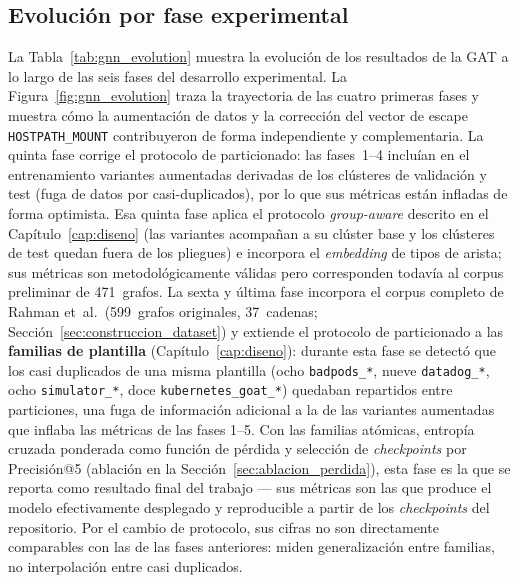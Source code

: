 \subsection{Evolución por fase experimental}

La Tabla~\ref{tab:gnn_evolution} muestra la evolución de los resultados de la \ac{GAT}
a lo largo de las seis fases del desarrollo experimental. La
Figura~\ref{fig:gnn_evolution} traza la trayectoria de las cuatro
primeras fases y muestra cómo la aumentación de datos y la corrección del vector
de escape \texttt{HOSTPATH\_MOUNT} contribuyeron de forma independiente y
complementaria. La quinta fase corrige el protocolo de particionado: las fases~1--4
incluían en el entrenamiento variantes aumentadas derivadas de los
clústeres de validación y test (fuga de datos por casi-duplicados), por lo que sus
métricas están infladas de forma optimista. Esa quinta fase aplica el protocolo
\textit{group-aware} descrito en el Capítulo~\ref{cap:diseno} (las variantes acompañan a su
clúster base y los clústeres de test quedan fuera de los pliegues) e incorpora el
\textit{embedding} de tipos de arista; sus métricas son metodológicamente válidas
pero corresponden todavía al corpus preliminar de 471~grafos. La sexta y última
fase incorpora el corpus completo de Rahman et~al.\ (599~grafos originales,
37~cadenas; Sección~\ref{sec:construccion_dataset}) y extiende el protocolo de
particionado a las \textbf{familias de plantilla} (Capítulo~\ref{cap:diseno}):
durante esta fase se detectó que los casi duplicados de una misma plantilla
(ocho \texttt{badpods\_*}, nueve \texttt{datadog\_*}, ocho
\texttt{simulator\_*}, doce \texttt{kubernetes\_goat\_*}) quedaban repartidos
entre particiones, una fuga de información adicional a la de las variantes
aumentadas que inflaba las métricas de las fases 1--5. Con las familias atómicas,
entropía cruzada ponderada como función de pérdida y selección de
\textit{checkpoints} por Precisión@5 (ablación en la
Sección~\ref{sec:ablacion_perdida}), esta fase es la que se reporta como
resultado final del trabajo — sus métricas son las que produce el modelo
efectivamente desplegado y reproducible a partir de los \textit{checkpoints} del
repositorio. Por el cambio de protocolo, sus cifras no son directamente
comparables con las de las fases anteriores: miden generalización entre familias,
no interpolación entre casi duplicados.

